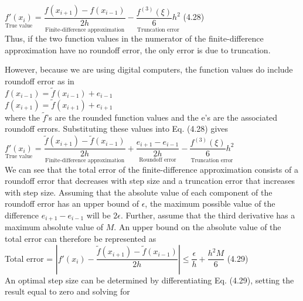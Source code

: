 \documentclass[../main.tex]{subfiles}
\begin{document}
$\underset{\text{True value}}{f'(x_i)} = \underset{\text{Finite-difference approximation}}{\dfrac{f(x_{i+1})-f(x_{i-1})}{2h}}-\underset{\text{Truncation error}}{\dfrac{f^{(3)}(\xi)}{6}h^2}$
\hfill
(4.28)\\

\noindent
Thus, if the two function values in the numerator of the finite-difference approximation
have no roundoff error, the only error is due to truncation.

\noindent
However, because we are using digital computers, the function values do include
roundoff error as in\\

$f(x_{i-1}) = \tilde{f}(x_{i-1}) + e_{i-1}$\\

$f(x_{i+1}) = \tilde{f}(x_{i+1}) + e_{i+1}$\\

\noindent
where the $\tilde{f}$'s are the rounded function values and the e's are the associated roundoff
errors. Substituting these values into Eq. (4.28) gives\\

$\underset{\text{True value}}{f'(x_i)}=\underset{\text{Finite-difference approximation}}{\dfrac{\tilde{f}(x_{i+1})-\tilde{f}(x_{i-1})}{2h}}
 + \underset{\text{Roundoff error}}{\dfrac{e_{i+1}-e_{i-1}}{2h}}-\underset{\text{Truncation error}}{\dfrac{f^{(3)}(\xi)}{6}h^2}$\\

 \noindent
 We can see that the total error of the finite-difference approximation consists of a roundoff
error that decreases with step size and a truncation error that increases with step size.
Assuming that the absolute value of each component of the roundoff error has an
upper bound of $\epsilon$, the maximum possible value of the difference $e_{i+1} - e_{i-1}$ will be $2\epsilon$. Further,
assume that the third derivative has a maximum absolute value of $M$. An upper bound
on the absolute value of the total error can therefore be represented as\\

Total error = $\left\lvert f'(x_i)-\dfrac{\tilde{f}(x_{i+1})-\tilde{f}(x_{i-1})}{2h} \right\rvert \leq \dfrac{\epsilon}{h} + \dfrac{h^2M}{6}$
\hfill
(4.29)\\

\noindent
An optimal step size can be determined by differentiating Eq. (4.29), setting the result
equal to zero and solving for\\
\end{document}
